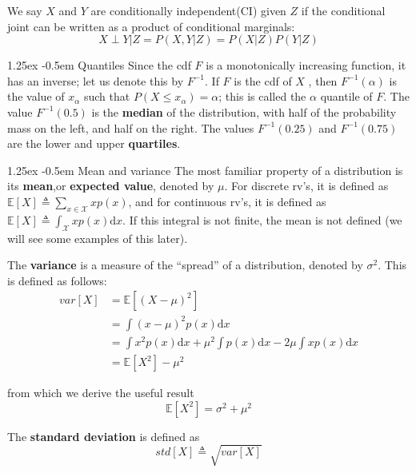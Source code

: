 \documentclass[8pt]{article}
\makeatletter
\newlength{\norm}
\newlength{\nrm}
\renewcommand{\paragraph}{%
  \@startsection{paragraph}{4}%
  {\z@}{1.25ex \@plus 2pt \@minus 2pt}{-0.5em}%
  {\fontsize{\f@size}{\nrm}\normalfont\bfseries}%
}
\makeatother
\begin{document}
We say $X$ and $Y$ are conditionally independent(CI) given $Z$ if the conditional joint can be written as a product of conditional marginals:
\begin{equation}
X \perp Y|Z=P(X,Y|Z)=P(X|Z)P(Y|Z)
\end{equation}

\paragraph{Quantiles}
Since the cdf $F$ is a monotonically increasing function, it has an inverse; let us denote this by $F^{-1}$. If $F$ is the cdf of $X$ , then $F^{-1}(\alpha)$ is the value of $x_{\alpha}$ such that $P(X \leq x_{\alpha})=\alpha$; this is called the $\alpha$ quantile of $F$. The value $F^{-1}(0.5)$ is the \textbf{median} of the distribution, with half of the probability mass on the left, and half on the right. The values $F^{-1}(0.25)$ and $F^{−1}(0.75)$are the lower and upper \textbf{quartiles}.

\paragraph{Mean and variance}
The most familiar property of a distribution is its \textbf{mean},or \textbf{expected value}, denoted by $\mu$. For discrete rv’s, it is defined as $\mathbb{E}[X] \triangleq \sum_{x \in \mathcal{X}}xp(x)$, and for continuous rv’s, it is defined as $\mathbb{E}[X] \triangleq \int_{\mathcal{X}}xp(x)\mathrm{d}x$. If this integral is not finite, the mean is not defined (we will see some examples of this later). 

The \textbf{variance} is a measure of the “spread” of a distribution, denoted by $\sigma^2$. This is defined as follows:
\begin{align}
var[X]& =\mathbb{E}[(X-\mu)^2] \\
      & =\int{(x-\mu)^2p(x)\mathrm{d}x} \nonumber \\
      & =\int{x^2p(x)\mathrm{d}x}+{\mu}^2\int{p(x)\mathrm{d}x}-2\mu\int{xp(x)\mathrm{d}x} \nonumber \\
	  & =\mathbb{E}[X^2]-{\mu}^2
\end{align}

from which we derive the useful result
\begin{equation}
\mathbb{E}[X^2]=\sigma^2+{\mu}^2
\end{equation}

The \textbf{standard deviation} is defined as
\begin{equation}
std[X] \triangleq \sqrt{var[X]}
\end{equation}
\end{document}
